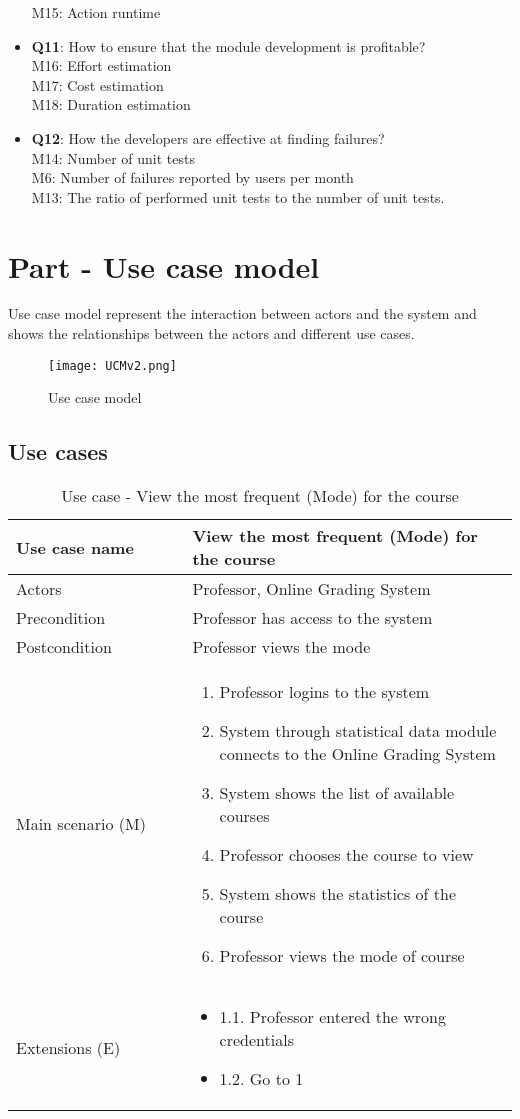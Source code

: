 \documentclass[12pt]{article}
\newcommand\tabularhead[1]{
\begin{table}[h]
  \caption{Use case - #1}
  \begin{tabular}{|p{0.35\linewidth}|p{0.65\linewidth}|}
    \hline
    \textbf{Use case name} & \textbf{#1} \\
    \hline}
\newcommand\addrow[2]{#1 &#2\\ \hline}
\newcommand\adddoublerow[2]{\begin{minipage}[t][][t]{2.5cm}#1\end{minipage}%
    &\begin{minipage}[t][][t]{\linewidth}
     \begin{itemize}\setlength{\itemsep}{0pt}%
        #2     
     \end{itemize}
     \end{minipage}\\ \hline}
\newcommand\addmulrow[2]{ \begin{minipage}[t][][t]{2.5cm}#1\end{minipage}%
     &\begin{minipage}[t][][t]{\linewidth}
      \begin{enumerate}\setlength{\itemsep}{0pt}%
        #2   
      \end{enumerate}
      \end{minipage}\\ \hline}
\newenvironment{usecase}{\tabularhead}
{\hline\end{tabular}\end{table}}
\begin{document}
\begin{itemize}
     M15: Action runtime
    \item \textbf{Q11}: How to ensure that the module development is profitable?\\
     M16: Effort estimation\\
     M17: Cost estimation\\
     M18: Duration estimation
    \item \textbf{Q12}: How the developers are effective at finding failures?\\
     M14: Number of unit tests\\
     M6: Number of failures reported by users per month\\
     M13: The ratio of performed unit tests to the number of unit tests. 
\end{itemize}
\newpage
\section{Part - Use case model}
Use case model represent the interaction between actors and the system and shows the relationships between the actors and different use cases.\cite{UCM}
\begin{figure}[h]
\centering
\texttt{[image: UCMv2.png]}
\caption{Use case model}
\end{figure}
\newpage
\subsection{Use cases}

\begin{usecase}{View the most frequent (Mode) for the course}
    \addrow{Actors}{Professor, Online Grading System}
    \addrow{Precondition}{Professor has access to the system}
    \addrow{Postcondition}{Professor views the mode}
    \addmulrow{Main scenario (M)}{
        \item Professor logins to the system
        \item System through statistical data module connects to the Online Grading System
        \item System shows the list of available courses
        \item Professor chooses the course to view
        \item System shows the statistics of the course
        \item Professor views the mode of course
    }
    \adddoublerow{Extensions (E)}{
        \item[] 1.1. Professor entered the wrong credentials
        \item[] 1.2. Go to 1
    }
\end{usecase}
\end{document}
